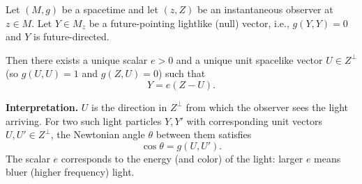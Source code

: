 Let $(M, g)$ be a spacetime and let $(z, Z)$ be an instantaneous observer at $z \in M$. Let $Y \in M_z$ be a future-pointing lightlike (null) vector, i.e., $g(Y, Y) = 0$ and $Y$ is future-directed.

Then there exists a unique scalar $e > 0$ and a unique unit spacelike vector $U \in Z^\perp$ (so $g(U, U) = 1$ and $g(Z, U) = 0$) such that
$$Y = e(Z - U).$$

\textbf{Interpretation.} $U$ is the direction in $Z^\perp$ from which the observer sees the light arriving. For two such light particles $Y, Y'$ with corresponding unit vectors $U, U' \in Z^\perp$, the Newtonian angle $\theta$ between them satisfies
$$\cos \theta = g(U, U').$$
The scalar $e$ corresponds to the energy (and color) of the light: larger $e$ means bluer (higher frequency) light.
